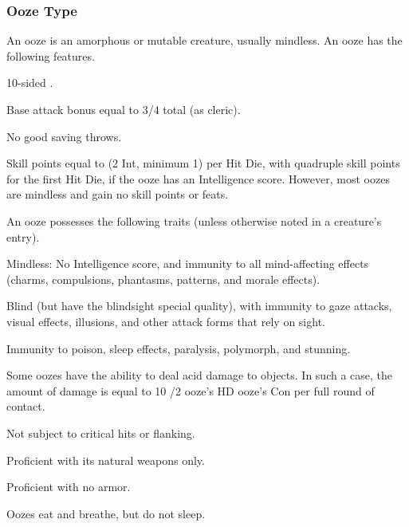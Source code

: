 {\subsubsection{Ooze Type} An ooze is an amorphous or mutable creature, usually mindless.
 An ooze has the following features.
\begin{itemize*}
\item 10-sided .
\item Base attack bonus equal to 3/4 total  (as cleric).
\item No good saving throws.
\item Skill points equal to (2 \add Int, minimum 1) per Hit Die, with quadruple skill points for the first Hit Die, if the ooze has an Intelligence score. However, most oozes are mindless and gain no skill points or feats.
\end{itemize*}
 An ooze possesses the following traits (unless otherwise noted in a creature's entry).
\begin{itemize*}
\item Mindless: No Intelligence score, and immunity to all mind-affecting effects (charms, compulsions, phantasms, patterns, and morale effects).
\item Blind (but have the blindsight special quality), with immunity to gaze attacks, visual effects, illusions, and other attack forms that rely on sight.
\item Immunity to poison, sleep effects, paralysis, polymorph, and stunning.
\item Some oozes have the ability to deal acid damage to objects. In such a case, the amount of damage is equal to 10 /2 ooze's HD \add ooze's Con per full round of contact.
\item Not subject to critical hits or flanking.
\item Proficient with its natural weapons only.
\item Proficient with no armor.
\item Oozes eat and breathe, but do not sleep.
\end{itemize*}

}
